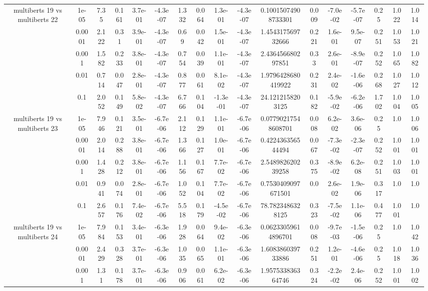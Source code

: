 \begin{tabular}{|c|c|c|c|c|c|c|c|c|c|c|c|c|c|c|c|c|}
\hline
\multirow{5}{*}{multiberts 19 vs multiberts 22} & 1e-05 & 7.35 & 0.161 & 3.7e-01 & -4.3e-07 & 1.332 & 0.064 & 1.3e-01 & -4.3e-07 & 0.10015074908733301 & 0.009 & -7.0e-02 & -5.7e-07 & 0.25 & 1.022 & 1.014 \\
 & 0.0001 & 2.122 & 0.31 & 3.9e-01 & -4.3e-07 & 0.69 & 0.042 & 1.5e-01 & -4.3e-07 & 1.454317569732666 & 0.221 & 1.6e-01 & 9.5e-07 & 0.251 & 1.053 & 1.021 \\
 & 0.001 & 1.582 & 0.233 & 3.8e-01 & -4.3e-07 & 0.754 & 0.039 & 1.1e-01 & -4.3e-07 & 2.436456680297851 & 0.33 & 2.6e-01 & -8.9e-07 & 0.252 & 1.065 & 1.082 \\
 & 0.01 & 0.714 & 0.047 & 2.8e-01 & -4.3e-07 & 0.877 & 0.061 & 8.1e-02 & -4.3e-07 & 1.9796428680419922 & 0.231 & 2.4e-02 & -1.6e-06 & 0.268 & 1.027 & 1.012 \\
 & 0.1 & 2.052 & 0.149 & 5.8e-02 & -4.3e-07 & 6.766 & 0.104 & -1.3e-01 & -4.3e-07 & 24.1212158203125 & 0.182 & -5.9e-02 & -6.2e-06 & 1.702 & 1.004 & 1.005 \\
\hline
\multirow{5}{*}{multiberts 19 vs multiberts 23} & 1e-05 & 7.946 & 0.121 & 3.5e-01 & -6.7e-06 & 2.112 & 0.129 & 1.1e-01 & -6.7e-06 & 0.07790217548608701 & 0.008 & 6.2e-02 & 3.6e-06 & 0.25 & 1.0 & 1.006 \\
 & 0.0001 & 2.014 & 0.288 & 3.8e-01 & -6.7e-06 & 1.366 & 0.127 & 1.0e-01 & -6.7e-06 & 0.422436356544494 & 0.067 & -7.3e-02 & -2.3e-07 & 0.252 & 1.001 & 1.001 \\
 & 0.001 & 1.428 & 0.212 & 3.8e-01 & -6.7e-06 & 1.156 & 0.167 & 7.7e-02 & -6.7e-06 & 2.548982620239258 & 0.375 & -8.9e-02 & 6.2e-08 & 0.251 & 1.003 & 1.001 \\
 & 0.01 & 0.941 & 0.074 & 2.8e-01 & -6.7e-06 & 1.052 & 0.104 & 7.7e-02 & -6.7e-06 & 0.7530409097671501 & 0.0 & 2.6e-02 & 1.9e-06 & 0.317 & 1.0 & 1.0 \\
 & 0.1 & 2.657 & 0.176 & 7.4e-02 & -6.7e-06 & 5.518 & 0.179 & -4.5e-02 & -6.7e-06 & 78.7823486328125 & 0.323 & -7.5e-02 & 1.1e-06 & 0.477 & 1.001 & 1.0 \\
\hline
\multirow{5}{*}{multiberts 19 vs multiberts 24} & 1e-05 & 7.984 & 0.153 & 3.4e-01 & -6.3e-06 & 1.928 & 0.064 & 9.4e-02 & -6.3e-06 & 0.06233059614896701 & 0.008 & -9.7e-03 & -1.5e-06 & 0.25 & 1.0 & 1.042 \\
 & 0.0001 & 2.429 & 0.328 & 3.7e-01 & -6.3e-06 & 1.035 & 0.065 & 1.1e-01 & -6.3e-06 & 1.608386039733886 & 0.251 & 1.2e-01 & -4.6e-06 & 0.25 & 1.018 & 1.036 \\
 & 0.001 & 1.31 & 0.178 & 3.7e-01 & -6.3e-06 & 0.906 & 0.061 & 6.2e-02 & -6.3e-06 & 1.957533836364746 & 0.324 & -2.2e-02 & 2.4e-06 & 0.252 & 1.001 & 1.002 \\

\end{tabular}
